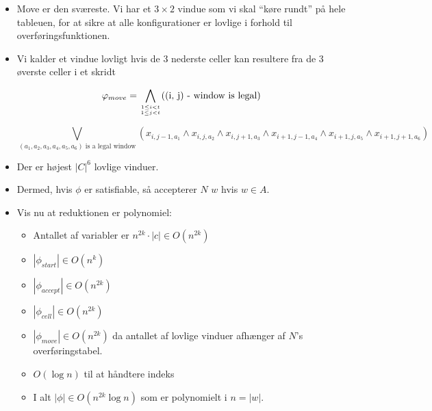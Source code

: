 \begin{itemize}
	\item Move er den sværeste. Vi har et \(3 \times 2\) vindue som vi skal ``køre rundt'' på hele tableuen, for at sikre at alle konfigurationer er lovlige i forhold til overføringsfunktionen.
	\item Vi kalder et vindue lovligt hvis de 3 nederste celler kan resultere fra de 3 øverste celler i et skridt

	      \[
		      \varphi_{move} = \bigwedge_{1 \leq i < t \atop 1 \leq j < t} (\text{(i, j) - window is legal})
	      \]

	      \[
		      \bigvee_{(a_1, a_2, a_3, a_4, a_5, a_6) \text{ is a legal window}} (x_{i, j-1, a_1} \land x_{i, j, a_2} \land x_{i, j+1, a_3} \land x_{i+1, j-1, a_4} \land x_{i+1, j, a_5} \land x_{i+1, j+1, a_6})
	      \]
	\item Der er højest $|C|^{6}$ lovlige vinduer.
	\item Dermed, hvis \(\phi\) er satisfiable, så accepterer $N$ $w$ hvis $w \in A$.
	\item Vis nu at reduktionen er polynomiel:
	      \begin{itemize}
		      \item Antallet af variabler er $n^{2k} \cdot |c| \in O(n^{2k})$
		      \item $|\phi_{start}| \in O(n^{k})$
		      \item $|\phi_{accept}| \in O(n^{2k})$
		      \item $|\phi_{cell}| \in O(n^{2k})$
		      \item $|\phi_{move}| \in O(n^{2k})$ da antallet af lovlige vinduer afhænger af $N$'s overføringstabel.
		      \item $O(\log n)$ til at håndtere indeks
		      \item I alt $|\phi| \in O(n^{2k} \log n)$ som er polynomielt i $n = |w|$.
	      \end{itemize}
\end{itemize}
\newpage

